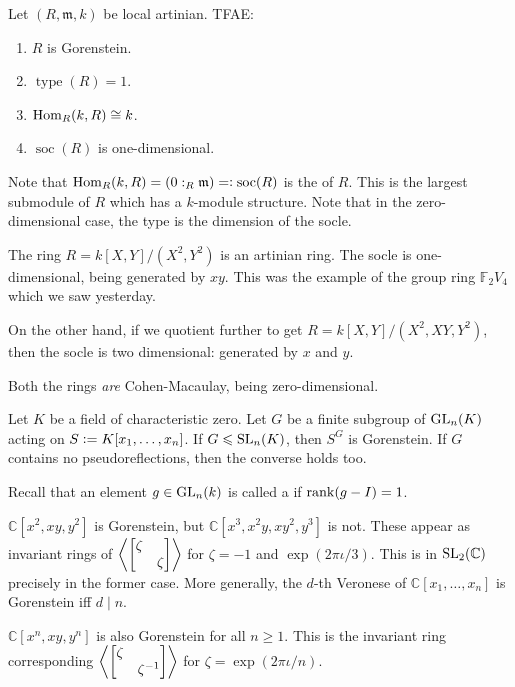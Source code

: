 \documentclass[12pt]{article}
\DeclareMathOperator{\ty}{type}
\DeclareMathOperator{\soc}{soc}
\begin{document}
\begin{thm}
	Let $(R, \mathfrak{m}, k)$ be local artinian. TFAE:
	\begin{enumerate}
		\item $R$ is Gorenstein.
		\item $\ty(R) = 1$.
		\item $\operatorname{Hom}_{R}(k, R) \cong k$.
		\item $\soc(R)$ is one-dimensional.
	\end{enumerate}
\end{thm}
Note that $\Hom_{R}(k, R) = (0 :_{R} \mathfrak{m}) =\vcentcolon \soc(R)$ is the  of $R$. This is the largest submodule of $R$ which has a $k$-module structure. \newline
Note that in the zero-dimensional case, the type is the dimension of the socle.

\begin{ex}
	The ring $R = k[X, Y]/(X^{2}, Y^{2})$ is an artinian ring. The socle is one-dimensional, being generated by $xy$. This was the example of the group ring $\mathbb{F}_{2} V_{4}$ which we saw yesterday.

	On the other hand, if we quotient further to get $R = k[X, Y]/(X^{2}, XY, Y^{2})$, then the socle is two dimensional: generated by $x$ and $y$.

	Both the rings \emph{are} Cohen-Macaulay, being zero-dimensional.
\end{ex}

\begin{thm}[Watanabe]
	Let $K$ be a field of characteristic zero. Let $G$ be a finite subgroup of $\operatorname{GL}_{n}(K)$ acting on $S \vcentcolon= K[x_{1}, \ldots, x_{n}]$. \newline
	If $G \leqslant \operatorname{SL}_{n}(K)$, then $S^{G}$ is Gorenstein. \newline
	If $G$ contains no pseudoreflections, then the converse holds too.
\end{thm}

Recall that an element $g \in \operatorname{GL}_{n}(k)$ is called a  if $\operatorname{rank}(g - I) = 1$.

\begin{ex}
	$\mathbb{C}[x^{2}, xy, y^{2}]$ is Gorenstein, but $\mathbb{C}[x^{3}, x^{2} y, x y^{2}, y^{3}]$ is not. These appear as invariant rings of $\left \langle \begin{bmatrix} \zeta &  \\  & \zeta \end{bmatrix} \right \rangle$ for $\zeta = -1$ and $\exp(2 \pi \iota/3)$. This is in $\operatorname{SL}_{2}(\mathbb{C})$ precisely in the former case. \newline
	More generally, the $d$-th Veronese of $\mathbb{C}[x_{1}, \ldots, x_{n}]$ is Gorenstein iff $d \mid n$.

	$\mathbb{C}[x^{n}, xy, y^{n}]$ is also Gorenstein for all $n \ge 1$. This is the invariant ring corresponding $\left \langle \begin{bmatrix} \zeta &  \\  & \zeta^{-1} \end{bmatrix} \right \rangle$ for $\zeta = \exp(2 \pi \iota/n)$.
\end{ex}
\end{document}
